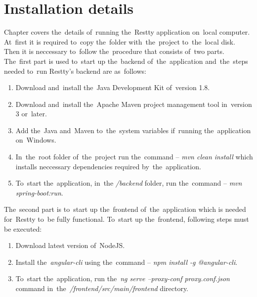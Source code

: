

\chapter{Installation details}
Chapter covers the~details of~running the~Restty application on~local computer. At~first it is required to~copy the~folder
with~the~project to~the~local disk. Then it is neccessary to~follow the~procedure that consists of~two parts. 
The~first part is used to~start up the~backend of~the~application and~the~steps needed to~run Restty's backend are as~follows:

\begin{enumerate}
  \item Download and~install the~Java Development Kit of~version 1.8.
  \item Download and~install the~Apache Maven project management tool in~version 3 or~later.
  \item Add the~Java and~Maven to~the~system variables if~running the~application on~Windows.
  \item In~the~root folder of~the~project run the~command -- \textit{mvn clean install} which installs
		neccessary dependencies required by~the~application.
  \item To~start the~application, in~the \textit{/backend} folder, run the~command -- \textit{mvn spring-boot:run}. 
\end{enumerate}

The~second part is to~start up the~frontend of~the~application which is needed for~Restty to~be fully functional.
To~start up the~frontend, following steps must be executed:

\begin{enumerate}
  \item Download latest version of~NodeJS.
  \item Install the~\textit{angular-cli} using the~command -- \textit{npm install -g @angular-cli}.
  \item To~start the~application, run the~\textit{ng serve --proxy-conf proxy.conf.json} command
  	 	in~the~\textit{/frontend/src/main/frontend} directory. 
\end{enumerate}
